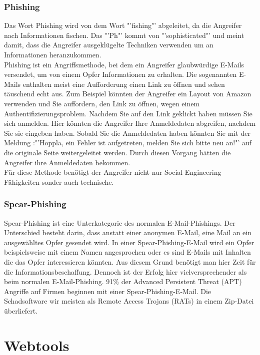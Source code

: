 		\subsubsection{Phishing}
		Das Wort Phishing wird von dem Wort "'fishing"' abgeleitet, da die Angreifer nach Informationen fischen. Das "'Ph"' kommt von "'sophisticated"' und meint damit, dass die Angreifer ausgeklügelte Techniken verwenden um an Informationen heranzukommen.\cite{PhishingExposed}\\
		Phishing ist ein Angriffsmethode, bei dem ein Angreifer glaubwürdige E-Mails versendet, um von einem Opfer Informationen zu erhalten. Die sogenannten E-Mails enthalten meist eine Aufforderung einen Link zu öffnen und sehen täuschend echt aus. Zum Beispiel könnten der Angreifer ein Layout von Amazon verwenden und Sie auffordern, den Link zu öffnen, wegen einem Authentifizierungsproblem. Nachdem Sie auf den Link geklickt haben müssen Sie sich anmelden. Hier könnten die Angreifer Ihre Anmeldedaten abgreifen, nachdem Sie sie eingeben haben. Sobald Sie die Anmeldedaten haben könnten Sie mit der Meldung :"'Hoppla, ein Fehler ist aufgetreten, melden Sie sich bitte neu an!"' auf die originale Seite weitergeleitet werden. Durch diesen Vorgang hätten die Angreifer ihre Anmeldedaten bekommen.\\
		Für diese Methode benötigt der Angreifer nicht nur Social Engineering Fähigkeiten sonder auch technische.\cite{PhishingDarkWaters}
		
		\subsubsection{Spear-Phishing}
		Spear-Phishing ist eine Unterkategorie des normalen E-Mail-Phishings. Der Unterschied besteht darin, dass anstatt einer anonymen E-Mail, eine Mail an ein ausgewähltes Opfer gesendet wird. In einer Spear-Phishing-E-Mail wird ein Opfer beispielsweise mit einem Namen angesprochen oder es sind E-Mails mit Inhalten die das Opfer interessieren könnten. Aus diesem Grund benötigt man hier Zeit für die Informationsbeschaffung. Dennoch ist der Erfolg hier vielversprechender als beim normalen E-Mail-Phishing.
		91\% der Advanced Persistent Threat (APT) Angriffe auf Firmen beginnen mit einer Spear-Phishing-E-Mail. Die Schadsoftware wir meisten als Remote Access Trojans (RATs) in einem Zip-Datei überliefert.\cite{SpearPhishing}


\section{Webtools}
